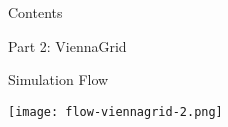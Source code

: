

\begin{frame}{Contents}
  \begin{center}
   \Large Part 2: ViennaGrid
  \end{center}
\end{frame}

\begin{frame}{Simulation Flow}
  \begin{center}
   \texttt{[image: flow-viennagrid-2.png]}
  \end{center}
\end{frame}












